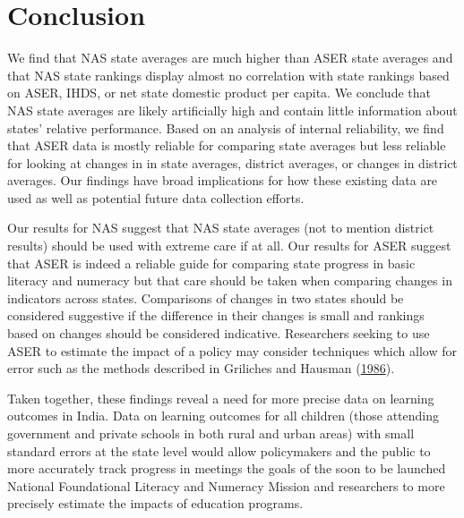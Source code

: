 \documentclass[
  11pt,
]{article}
\begin{document}
\hypertarget{conclusion}{%
\section{Conclusion}\label{conclusion}}

We find that NAS state averages are much higher than ASER state averages and that NAS state rankings display almost no correlation with state rankings based on ASER, IHDS, or net state domestic product per capita. We conclude that NAS state averages are likely artificially high and contain little information about states' relative performance. Based on an analysis of internal reliability, we find that ASER data is mostly reliable for comparing state averages but less reliable for looking at changes in in state averages, district averages, or changes in district averages. Our findings have broad implications for how these existing data are used as well as potential future data collection efforts.

Our results for NAS suggest that NAS state averages (not to mention district results) should be used with extreme care if at all. Our results for ASER suggest that ASER is indeed a reliable guide for comparing state progress in basic literacy and numeracy but that care should be taken when comparing changes in indicators across states. Comparisons of changes in two states should be considered suggestive if the difference in their changes is small and rankings based on changes should be considered indicative. Researchers seeking to use ASER to estimate the impact of a policy may consider techniques which allow for error such as the methods described in Griliches and Hausman (\protect\hyperlink{ref-griliches1986errors}{1986}).

Taken together, these findings reveal a need for more precise data on learning outcomes in India. Data on learning outcomes for all children (those attending government and private schools in both rural and urban areas) with small standard errors at the state level would allow policymakers and the public to more accurately track progress in meetings the goals of the soon to be launched National Foundational Literacy and Numeracy Mission and researchers to more precisely estimate the impacts of education programs.
\end{document}
